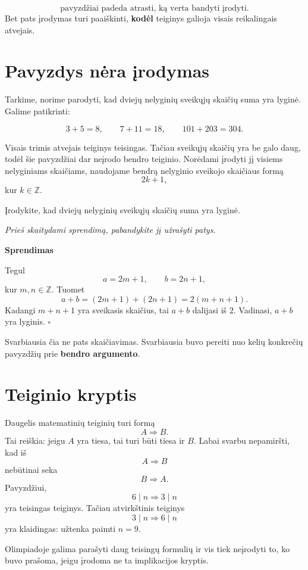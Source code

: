 \documentclass[11pt,a4paper]{scrartcl}
\newenvironment{solution}
    {\begin{list}{}{\setlength{\leftmargin}{10pt}\setlength{\rightmargin}{10pt}}\item[]}
    {\end{list}}
\begin{document}
\[
\boxed{\text{pavyzdžiai padeda atrasti, ką verta bandyti įrodyti.}}
\]
Bet pats įrodymas turi paaiškinti, \textbf{kodėl} teiginys galioja visais
reikalingais atvejais.

\section{Pavyzdys nėra įrodymas}

Tarkime, norime parodyti, kad dviejų nelyginių sveikųjų skaičių suma yra
lyginė. Galime patikrinti:

\[
3+5=8,\qquad 7+11=18,\qquad 101+203=304.
\]

Visais trimis atvejais teiginys teisingas. Tačiau sveikųjų skaičių yra
be galo daug, todėl šie pavyzdžiai dar neįrodo bendro teiginio. Norėdami įrodyti jį visiems nelyginiams skaičiams, naudojame bendrą
nelyginio sveikojo skaičiaus formą
\[
2k+1,
\]
kur $k\in\mathbb Z$.

\begin{example}
Įrodykite, kad dviejų nelyginių sveikųjų skaičių suma yra lyginė.
\end{example}

\textit{Prieš skaitydami sprendimą, pabandykite jį užrašyti patys.}

\begin{solution}
\textbf{Sprendimas}

Tegul
\[
a=2m+1,\qquad b=2n+1,
\]
kur $m,n\in\mathbb Z$. Tuomet
\[
a+b=(2m+1)+(2n+1)=2(m+n+1).
\]
Kadangi $m+n+1$ yra sveikasis skaičius, tai $a+b$ dalijasi iš $2$. Vadinasi, $a+b$ yra lyginis. \hfill $\square$
\end{solution}

Svarbiausia čia ne pats skaičiavimas. Svarbiausia buvo pereiti nuo kelių
konkrečių pavyzdžių prie \textbf{bendro argumento}.

\section{Teiginio kryptis}

Daugelis matematinių teiginių turi formą
\[
A\Longrightarrow B.
\]
Tai reiškia: jeigu $A$ yra tiesa, tai turi būti tiesa ir $B$. Labai svarbu nepamiršti, kad iš
\[
A\Longrightarrow B
\]
nebūtinai seka
\[
B\Longrightarrow A.
\]
Pavyzdžiui,
\[
6\mid n\Longrightarrow 3\mid n
\]
yra teisingas teiginys. Tačiau atvirkštinis teiginys
\[
3\mid n\Longrightarrow 6\mid n
\]
yra klaidingas: užtenka paimti $n=9$.

Olimpiadoje galima parašyti daug teisingų formulių ir vis tiek neįrodyti
to, ko buvo prašoma, jeigu įrodoma ne ta implikacijos kryptis.
\end{document}
